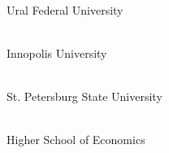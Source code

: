 
\cleardoublepage
{}

\newcommand\partner[3]{ \\ #3}

\partner{height=0.7in}{partners/urfu}{Ural Federal University}

\partner{height=0.7in}{partners/iu}{Innopolis University}

\partner{height=0.7in}{partners/spbu}{St. Petersburg State University}

\partner{height=0.8in}{partners/hse}{Higher School of Economics}
